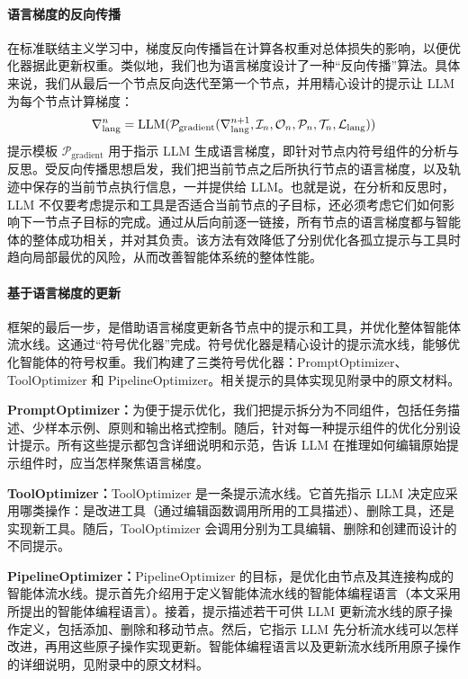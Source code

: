 \paragraph{语言梯度的反向传播}
在标准联结主义学习中，梯度反向传播旨在计算各权重对总体损失的影响，以便优化器据此更新权重。类似地，我们也为语言梯度设计了一种“反向传播”算法。具体来说，我们从最后一个节点反向迭代至第一个节点，并用精心设计的提示让 LLM 为每个节点计算梯度：
\begin{equation}
    \nabla_{\text{lang}}^n = \text{LLM}(\mathcal{P}_{\text{gradient}}(\nabla_{\text{lang}}^{n+1}, \mathcal{I}_n, \mathcal{O}_n, \mathcal{P}_n, \mathcal{T}_n, \mathcal{L}_{\text{lang}}))
\end{equation}
提示模板 $\mathcal{P}_{\text{gradient}}$ 用于指示 LLM 生成语言梯度，即针对节点内符号组件的分析与反思。受反向传播思想启发，我们把当前节点之后所执行节点的语言梯度，以及轨迹中保存的当前节点执行信息，一并提供给 LLM。也就是说，在分析和反思时，LLM 不仅要考虑提示和工具是否适合当前节点的子目标，还必须考虑它们如何影响下一节点子目标的完成。通过从后向前逐一链接，所有节点的语言梯度都与智能体的整体成功相关，并对其负责。该方法有效降低了分别优化各孤立提示与工具时趋向局部最优的风险，从而改善智能体系统的整体性能。

\paragraph{基于语言梯度的更新}
框架的最后一步，是借助语言梯度更新各节点中的提示和工具，并优化整体智能体流水线。这通过“符号优化器”完成。符号优化器是精心设计的提示流水线，能够优化智能体的符号权重。我们构建了三类符号优化器：PromptOptimizer、ToolOptimizer 和 PipelineOptimizer。相关提示的具体实现见附录中的原文材料。

\noindent\textbf{PromptOptimizer：}为便于提示优化，我们把提示拆分为不同组件，包括任务描述、少样本示例、原则和输出格式控制。随后，针对每一种提示组件的优化分别设计提示。所有这些提示都包含详细说明和示范，告诉 LLM 在推理如何编辑原始提示组件时，应当怎样聚焦语言梯度。

\noindent\textbf{ToolOptimizer：}ToolOptimizer 是一条提示流水线。它首先指示 LLM 决定应采用哪类操作：是改进工具（通过编辑函数调用所用的工具描述）、删除工具，还是实现新工具。随后，ToolOptimizer 会调用分别为工具编辑、删除和创建而设计的不同提示。

\noindent\textbf{PipelineOptimizer：}PipelineOptimizer 的目标，是优化由节点及其连接构成的智能体流水线。提示首先介绍用于定义智能体流水线的智能体编程语言（本文采用\citet{zhou2023agents}所提出的智能体编程语言）。接着，提示描述若干可供 LLM 更新流水线的原子操作定义，包括添加、删除和移动节点。然后，它指示 LLM 先分析流水线可以怎样改进，再用这些原子操作实现更新。智能体编程语言以及更新流水线所用原子操作的详细说明，见附录中的原文材料。

